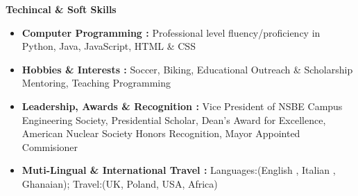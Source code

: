 \documentclass[letterpaper,12pt]{article}[leftmargin=*]
\def \entryspacing {-0pt}
\renewcommand{\section}[2]{\vspace{5pt}
  \colorbox{secondary}{\color{white}\raggedbottom\normalsize\textbf{{#1}{\hspace{7pt}#2}}}
}
\newcommand{\resumeEntryStart}{\begin{itemize}[leftmargin=2.5mm]}
\newcommand{\resumeEntryEnd}{\end{itemize}\vspace{\entryspacing}}
\newcommand{\resumeEntryS}[2]{
  \item[]\small{
    \textbf{\color{primary}#1 }{ #2 \vspace{-6pt}}
  }
}
\begin{document}

\section{\faGears}{ Techincal \& Soft Skills}
 \resumeEntryStart
  \resumeEntryS{Computer Programming : } {Professional level fluency/proficiency in Python, Java, JavaScript, HTML \& CSS}
  \resumeEntryS{Hobbies \& Interests :} {Soccer, Biking, Educational Outreach \& Scholarship Mentoring, Teaching Programming }
  \resumeEntryS{Leadership, Awards \& Recognition :} {Vice President of NSBE Campus Engineering Society, Presidential Scholar,     Dean’s Award for Excellence, American Nuclear Society Honors Recognition, Mayor Appointed Commisioner    }
  \resumeEntryS{Muti-Lingual \& International Travel :} {Languages:(English , Italian , Ghanaian); Travel:(UK, Poland, USA, Africa)}

  \resumeEntryEnd
\end{document}
